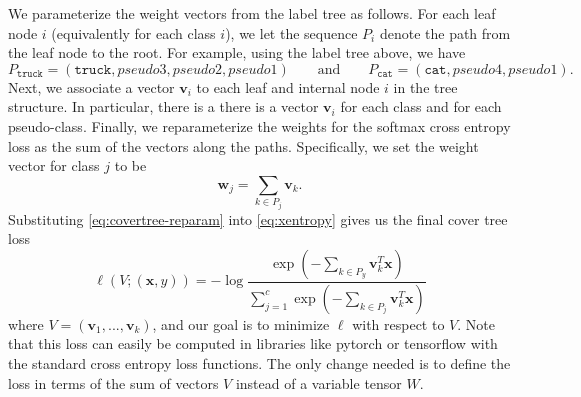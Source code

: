 \documentclass[10pt]{article}
\theoremstyle{definition}
\newcommand{\trans}[1]{{#1}^{T}}
\newcommand{\vv}{\mathbf v}
\newcommand{\w}{\mathbf w}
\newcommand{\x}{\mathbf x}
\begin{document}
\begin{center}
\end{center}

We parameterize the weight vectors from the label tree as follows.
For each leaf node $i$ (equivalently for each class $i$),
we let the sequence $P_i$ denote the path from the leaf node to the root.
For example, using the label tree above,
we have
\begin{equation}
    P_{\texttt{truck}} = (\texttt{truck}, \textit{pseudo3}, \textit{pseudo2}, \textit{pseudo1} ) \qquad\text{and}\qquad
    P_{\texttt{cat}} = (\texttt{cat}, \textit{pseudo4}, \textit{pseudo1} )
    .
\end{equation}
Next, we associate a vector $\vv_i$ to each leaf and internal node $i$ in the tree structure.
In particular, there is a there is a vector $\vv_i$ for each class and for each pseudo-class.
Finally, we reparameterize the weights for the softmax cross entropy loss as the sum of the vectors along the paths.
Specifically, we set the weight vector for class $j$ to be 
\begin{equation}
    \label{eq:covertree-reparam}
    \w_j = \sum_{k\in P_j} \vv_k
    .
\end{equation}
Substituting \eqref{eq:covertree-reparam} into \eqref{eq:xentropy} gives us the final cover tree loss
\begin{equation}
    \ell(V;(\x,y)) = - \log \frac {\exp(-\sum_{k\in P_y}\trans\vv_k \x)}{\sum_{j=1}^c \exp(- \sum_{k\in P_j}\trans\vv_k \x)}
\end{equation}
where $V=(\vv_1,...,\vv_k)$,
and our goal is to minimize $\ell$ with respect to $V$.
Note that this loss can easily be computed in libraries like pytorch or tensorflow with the standard cross entropy loss functions.
The only change needed is to define the loss in terms of the sum of vectors $V$ instead of a variable tensor $W$.
\end{document}
